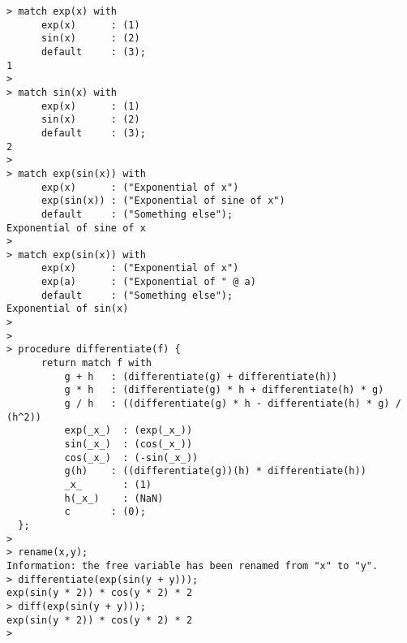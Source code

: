 \begin{center}\begin{minipage}{15cm}\begin{Verbatim}[frame=single]
> match exp(x) with 
      exp(x)      : (1) 
      sin(x)      : (2)
      default     : (3);
1
> 
> match sin(x) with 
      exp(x)      : (1) 
      sin(x)      : (2)
      default     : (3);
2
> 
> match exp(sin(x)) with
      exp(x)      : ("Exponential of x")
      exp(sin(x)) : ("Exponential of sine of x")
      default     : ("Something else");
Exponential of sine of x
> 
> match exp(sin(x)) with
      exp(x)      : ("Exponential of x")
      exp(a)      : ("Exponential of " @ a)
      default     : ("Something else");
Exponential of sin(x)
> 
> 
> procedure differentiate(f) {
      return match f with 
          g + h   : (differentiate(g) + differentiate(h))
          g * h   : (differentiate(g) * h + differentiate(h) * g)
          g / h   : ((differentiate(g) * h - differentiate(h) * g) / (h^2))
          exp(_x_)  : (exp(_x_))
          sin(_x_)  : (cos(_x_))
          cos(_x_)  : (-sin(_x_))
          g(h)    : ((differentiate(g))(h) * differentiate(h))
          _x_       : (1)
          h(_x_)    : (NaN)
          c       : (0);
  };
> 
> rename(x,y);
Information: the free variable has been renamed from "x" to "y".
> differentiate(exp(sin(y + y)));
exp(sin(y * 2)) * cos(y * 2) * 2
> diff(exp(sin(y + y)));
exp(sin(y * 2)) * cos(y * 2) * 2
> 
\end{Verbatim}
\end{minipage}\end{center}
